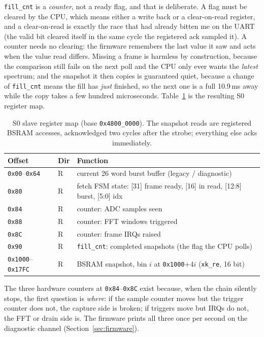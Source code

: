 \documentclass[a4paper,11pt]{article}
\begin{document}
\texttt{fill\_cnt} is a \emph{counter}, not a ready flag, and that is deliberate.
A flag must be cleared by the CPU, which means either a write back or a
clear-on-read register, and a clear-on-read is exactly the race that had already
bitten me on the UART (the valid bit cleared itself in the same cycle the
registered ack sampled it). A counter needs no clearing: the firmware remembers
the last value it saw and acts when the value read differs. Missing a frame is
harmless by construction, because the comparison still fails on the next poll and
the CPU only ever wants the \emph{latest} spectrum; and the snapshot it then
copies is guaranteed quiet, because a change of \texttt{fill\_cnt} means the fill
has \emph{just} finished, so the next one is a full 10.9\,ms away while the copy
takes a few hundred microseconds. Table~\ref{tab:s0map} is the resulting S0
register map.

\begin{table}[H]
\centering
\caption{S0 slave register map (base \texttt{0x4800\_0000}). The snapshot reads are
registered BSRAM accesses, acknowledged two cycles after the strobe; everything
else acks immediately.}
\label{tab:s0map}
\begin{tabular}{lll}
\toprule
\textbf{Offset} & \textbf{Dir} & \textbf{Function} \\
\midrule
\texttt{0x00}--\texttt{0x64} & R & current 26 word burst buffer (legacy / diagnostic) \\
\texttt{0x80} & R & fetch FSM state: [31] frame ready, [16] in read, [12:8] burst, [5:0] idx \\
\texttt{0x84} & R & counter: ADC samples seen \\
\texttt{0x88} & R & counter: FFT windows triggered \\
\texttt{0x8C} & R & counter: frame IRQs raised \\
\texttt{0x90} & R & \texttt{fill\_cnt}: completed snapshots (the flag the CPU polls) \\
\texttt{0x1000}--\texttt{0x17FC} & R & BSRAM snapshot, bin $i$ at \texttt{0x1000}$+4i$ (\texttt{xk\_re}, 16 bit) \\
\bottomrule
\end{tabular}
\end{table}

The three hardware counters at \texttt{0x84}--\texttt{0x8C} exist because, when the
chain silently stops, the first question is \emph{where}: if the sample counter
moves but the trigger counter does not, the capture side is broken; if triggers
move but IRQs do not, the FFT or drain side is. The firmware prints all three once
per second on the diagnostic channel (Section~\ref{sec:firmware}).
\end{document}
